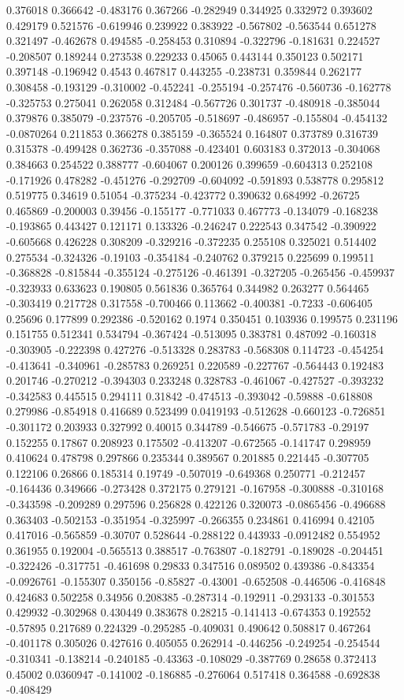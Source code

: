 0.376018 0.366642 -0.483176 0.367266 -0.282949 0.344925 0.332972 0.393602 0.429179 0.521576 -0.619946 0.239922 0.383922 -0.567802 -0.563544 0.651278 0.321497 -0.462678 0.494585 -0.258453 0.310894 -0.322796 -0.181631 0.224527 -0.208507 0.189244 0.273538 0.229233 0.45065 0.443144 0.350123 0.502171 0.397148 -0.196942 0.4543 0.467817 0.443255 -0.238731 0.359844 0.262177 0.308458 -0.193129 -0.310002 -0.452241 -0.255194 -0.257476 -0.560736 -0.162778 -0.325753 0.275041 0.262058 0.312484 -0.567726 0.301737 -0.480918 -0.385044 0.379876 0.385079 -0.237576 -0.205705 -0.518697 -0.486957 -0.155804 -0.454132 -0.0870264 0.211853 0.366278 0.385159 -0.365524 0.164807 0.373789 0.316739 0.315378 -0.499428 0.362736 -0.357088 -0.423401 0.603183 0.372013 -0.304068 0.384663 0.254522 0.388777 -0.604067 0.200126 0.399659 -0.604313 0.252108 -0.171926 0.478282 -0.451276 -0.292709 -0.604092 -0.591893 0.538778 0.295812 0.519775 0.34619 0.51054 -0.375234 -0.423772 0.390632 0.684992 -0.26725 0.465869 -0.200003 0.39456 -0.155177 -0.771033 0.467773 -0.134079 -0.168238 -0.193865 0.443427 0.121171 0.133326 -0.246247 0.222543 0.347542 -0.390922 -0.605668 0.426228 0.308209 -0.329216 -0.372235 0.255108 0.325021 0.514402 0.275534 -0.324326 -0.19103 -0.354184 -0.240762 0.379215 0.225699 0.199511 -0.368828 -0.815844 -0.355124 -0.275126 -0.461391 -0.327205 -0.265456 -0.459937 -0.323933 0.633623 0.190805 0.561836 0.365764 0.344982 0.263277 0.564465 -0.303419 0.217728 0.317558 -0.700466 0.113662 -0.400381 -0.7233 -0.606405 0.25696 0.177899 0.292386 -0.520162 0.1974 0.350451 0.103936 0.199575 0.231196 0.151755 0.512341 0.534794 -0.367424 -0.513095 0.383781 0.487092 -0.160318 -0.303905 -0.222398 0.427276 -0.513328 0.283783 -0.568308 0.114723 -0.454254 -0.413641 -0.340961 -0.285783 0.269251 0.220589 -0.227767 -0.564443 0.192483 0.201746 -0.270212 -0.394303 0.233248 0.328783 -0.461067 -0.427527 -0.393232 -0.342583 0.445515 0.294111 0.31842 -0.474513 -0.393042 -0.59888 -0.618808 0.279986 -0.854918 0.416689 0.523499 0.0419193 -0.512628 -0.660123 -0.726851 -0.301172 0.203933 0.327992 0.40015 0.344789 -0.546675 -0.571783 -0.29197 0.152255 0.17867 0.208923 0.175502 -0.413207 -0.672565 -0.141747 0.298959 0.410624 0.478798 0.297866 0.235344 0.389567 0.201885 0.221445 -0.307705 0.122106 0.26866 0.185314 0.19749 -0.507019 -0.649368 0.250771 -0.212457 -0.164436 0.349666 -0.273428 0.372175 0.279121 -0.167958 -0.300888 -0.310168 -0.343598 -0.209289 0.297596 0.256828 0.422126 0.320073 -0.0865456 -0.496688 0.363403 -0.502153 -0.351954 -0.325997 -0.266355 0.234861 0.416994 0.42105 0.417016 -0.565859 -0.30707 0.528644 -0.288122 0.443933 -0.0912482 0.554952 0.361955 0.192004 -0.565513 0.388517 -0.763807 -0.182791 -0.189028 -0.204451 -0.322426 -0.317751 -0.461698 0.29833 0.347516 0.089502 0.439386 -0.843354 -0.0926761 -0.155307 0.350156 -0.85827 -0.43001 -0.652508 -0.446506 -0.416848 0.424683 0.502258 0.34956 0.208385 -0.287314 -0.192911 -0.293133 -0.301553 0.429932 -0.302968 0.430449 0.383678 0.28215 -0.141413 -0.674353 0.192552 -0.57895 0.217689 0.224329 -0.295285 -0.409031 0.490642 0.508817 0.467264 -0.401178 0.305026 0.427616 0.405055 0.262914 -0.446256 -0.249254 -0.254544 -0.310341 -0.138214 -0.240185 -0.43363 -0.108029 -0.387769 0.28658 0.372413 0.45002 0.0360947 -0.141002 -0.186885 -0.276064 0.517418 0.364588 -0.692838 -0.408429 